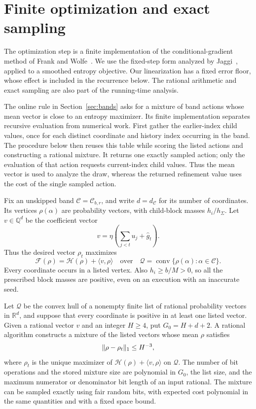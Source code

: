 \section{Finite optimization and exact sampling}
\label{sec:numerics}

The optimization step is a finite implementation of the conditional-gradient
method of Frank and Wolfe~\cite{FrankWolfe1956}. We use the fixed-step
form analyzed by Jaggi~\cite[Algorithm~2 and Theorem~1]{Jaggi2013}, applied
to a smoothed entropy objective. Our linearization has a fixed error floor,
whose effect is included in the recurrence below. The rational arithmetic
and exact sampling are also part of the running-time analysis.

The online rule in Section~\ref{sec:bands} asks for a mixture of band
actions whose mean vector is close to an entropy maximizer.  Its finite
implementation separates recursive evaluation from numerical work.
First gather the earlier-index child values, once for each distinct
coordinate and history index occurring in the band.  The procedure below
then reuses this table while scoring the listed actions and constructing
a rational mixture.  It returns one exactly sampled action; only the
evaluation of that action requests current-index child values.  Thus the
mean vector is used to analyze the draw, whereas the returned refinement
value uses the cost of the single sampled action.

Fix an unskipped band $\mathcal C=\mathcal C_{b,r}$, and write
$d=d_{\mathcal C}$ for its number of coordinates.  Its vertices
$\rho(\alpha)$ are probability vectors, with child-block masses
$h_i/h_\Sigma$.  Let $v\in\mathbb Q^d$ be the coefficient vector
\[
 v=\eta\left(\sum_{j<t}u_j+\widehat g_t\right).
\]
Thus the desired vector $\rho_t$ maximizes
\[
 \mathcal F(\rho)=\mathcal H(\rho)+\langle v,\rho\rangle
 \quad\text{over}\quad
 \mathcal Q=\operatorname{conv}\{\rho(\alpha):\alpha\in\mathcal C\}.
\]
Every coordinate occurs in a listed vertex.  Also $h_i\ge b/M>0$, so all
the prescribed block masses are positive, even on an execution with an
inaccurate seed.

\begin{lemma}
\label{lem:finite-optimizer}
Let $\mathcal Q$ be the convex hull of a nonempty finite list of rational
probability vectors in $\mathbb R^d$, and suppose that every coordinate
is positive in at least one listed vector.  Given a rational vector $v$
and an integer $H\ge4$, put $G_0=H+d+2$.  A rational algorithm constructs
a mixture of the listed vectors whose mean $\rho$ satisfies
\[
 \lVert\rho-\rho_t\rVert_1\le H^{-3},
\]
where $\rho_t$ is the unique maximizer of
$\mathcal H(\rho)+\langle v,\rho\rangle$ on $\mathcal Q$.
The number of bit operations and the stored mixture size are polynomial
in $G_0$, the list size, and the maximum numerator or denominator bit
length of an input rational.
The mixture can be sampled exactly using fair random bits, with expected
cost polynomial in the same quantities and with a fixed space bound.
\end{lemma}

